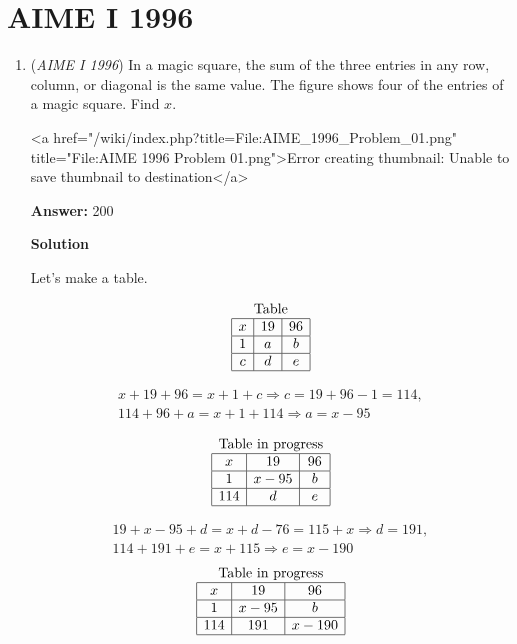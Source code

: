 \section{AIME I 1996}
        \begin{enumerate}
        	\item (\textit{AIME I 1996}) In a magic square, the sum of the three entries in any row, column, or diagonal is the same value. The figure shows four of the entries of a magic square. Find $x$. 


 <a href="/wiki/index.php?title=File:AIME\_1996\_Problem\_01.png" title="File:AIME 1996 Problem 01.png">Error creating thumbnail: Unable to save thumbnail to destination</a>

 \textbf{Answer: }200



\textbf{Solution}

Let's make a table.

 
 \[\begin{array}{|c|c|c|} \multicolumn{3}{c}{\text{Table}}\\\hline x&19&96\\\hline 1&a&b\\\hline c&d&e\\\hline \end{array}\]

 \begin{eqnarray*} x+19+96=x+1+c\Rightarrow c=19+96-1=114,\\ 114+96+a=x+1+114\Rightarrow a=x-95 \end{eqnarray*}

 \[\begin{array}{|c|c|c|} \multicolumn{3}{c}{\text{Table in progress}}\\\hline x&19&96\\\hline 1&x-95&b\\\hline 114&d&e\\\hline \end{array}\]

 \begin{eqnarray*}19+x-95+d=x+d-76=115+x\Rightarrow  d=191,\\ 114+191+e=x+115\Rightarrow e=x-190 \end{eqnarray*}
 \[\begin{array}{|c|c|c|} \multicolumn{3}{c}{\text{Table in progress}}\\\hline x&19&96\\\hline 1&x-95&b\\\hline 114&191&x-190\\\hline \end{array}\]


\end{enumerate}
